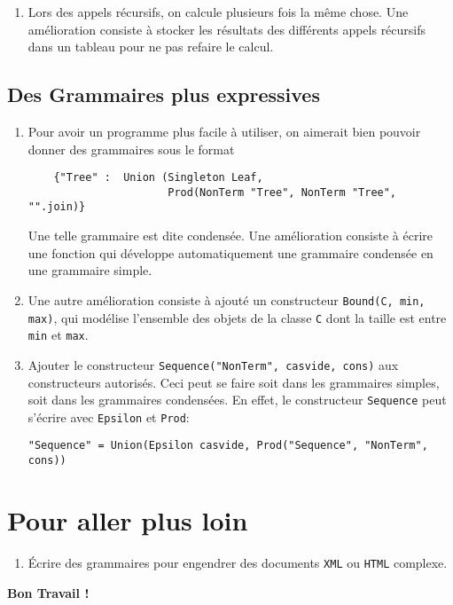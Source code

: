 \documentclass[11pt]{article}
\newcounter{asuivre}
\newenvironment{asks}{\begin{enumerate}\setcounter{enumi}{\theasuivre}}%
                       {\setcounter{asuivre}{\theenumi}\end{enumerate}}
\begin{document}
\begin{asks}
\item Lors des appels récursifs, on calcule plusieurs fois la même chose. Une
  amélioration consiste à stocker les résultats des différents appels
  récursifs dans un tableau pour ne pas refaire le calcul.
\end{asks}

\subsection{Des Grammaires plus expressives}

\begin{asks}
\item Pour avoir un programme plus facile à utiliser, on aimerait bien pouvoir
  donner des grammaires sous le format
\begin{verbatim}
    {"Tree" :  Union (Singleton Leaf,
                      Prod(NonTerm "Tree", NonTerm "Tree", "".join)}
\end{verbatim}
  Une telle grammaire est dite condensée. Une amélioration consiste à écrire
  une fonction qui développe automatiquement une grammaire
  condensée en une grammaire simple.
\item Une autre amélioration consiste à ajouté un constructeur
  \texttt{Bound(C, min, max)}, qui modélise l'ensemble des objets de la classe
  \texttt{C} dont la taille est entre \texttt{min} et \texttt{max}.
\item Ajouter le constructeur \texttt{Sequence("NonTerm", casvide, cons)} aux
  constructeurs autorisés. Ceci peut se faire soit dans les grammaires
  simples, soit dans les grammaires condensées.  En effet, le constructeur
  \texttt{Sequence} peut s'écrire avec \texttt{Epsilon} et \texttt{Prod}:
\begin{verbatim}
"Sequence" = Union(Epsilon casvide, Prod("Sequence", "NonTerm", cons))
\end{verbatim}
\end{asks}

\section{Pour aller plus loin}

\begin{asks}
\item Écrire des grammaires pour engendrer des documents \texttt{XML} ou
  \texttt{HTML} complexe.
\end{asks}
\bigskip
\bigskip
\bigskip
\hskip10cm{\Large\bf Bon Travail !}
\end{document}
